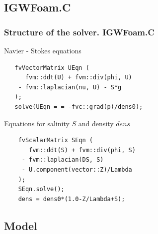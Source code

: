 \documentclass[serif,compress, blue, 11pt]{beamer}
\begin{document}
\subsection{IGWFoam.C}
\begin{frame}[fragile]\frametitle{Structure of the solver. IGWFoam.C}
\begin{block}{Navier - Stokes equations}
\begin{verbatim}
   fvVectorMatrix UEqn (
      fvm::ddt(U) + fvm::div(phi, U)
    - fvm::laplacian(nu, U) - S*g
   );
   solve(UEqn = = -fvc::grad(p)/dens0);
\end{verbatim}
\end{block}

\begin{block}{Equations for salinity $S$ and density $dens$}
\begin{verbatim}
    fvScalarMatrix SEqn (
       fvm::ddt(S) + fvm::div(phi, S)
     - fvm::laplacian(DS, S) 
     - U.component(vector::Z)/Lambda
    );
    SEqn.solve();
    dens = dens0*(1.0-Z/Lambda+S);
\end{verbatim}
\end{block}
\end{frame}

\subsection{Model}

% 
% 
% 
\end{document}
